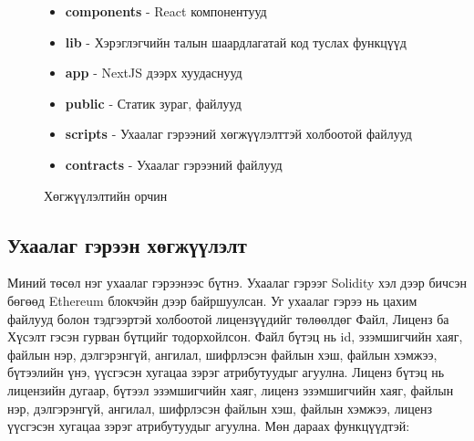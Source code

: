 \begin{figure}[htbp]
\begin{minipage}[ht]{0.4\textwidth}
       \caption{Хөгжүүлэлтийн орчин}
   \end{minipage}
   \begin{minipage}[h!t]{0.5\textwidth}
      \raggedright
      \begin{itemize}
         \item \textbf{components} - React компонентууд
         \item \textbf{lib} - Хэрэглэгчийн талын шаардлагатай код туслах функцүүд
         \item \textbf{app} - NextJS дээрх хуудаснууд
         \item \textbf{public} - Статик зураг, файлууд
         \item \textbf{scripts} - Ухаалаг гэрээний хөгжүүлэлттэй холбоотой файлууд
         \item \textbf{contracts} - Ухаалаг гэрээний файлууд
      \end{itemize}
  \end{minipage}
\end{figure}

\newpage
\subsection{Ухаалаг гэрээн хөгжүүлэлт}
Миний төсөл нэг ухаалаг гэрээнээс бүтнэ. Ухаалаг гэрээг Solidity хэл дээр бичсэн бөгөөд Ethereum  блокчэйн дээр байршуулсан. Уг ухаалаг гэрээ нь цахим файлууд болон тэдгээртэй холбоотой лицензүүдийг төлөөлдөг Файл, Лиценз ба Хүсэлт гэсэн гурван бүтцийг тодорхойлсон. Файл бүтэц  нь id, эзэмшигчийн хаяг, файлын нэр, дэлгэрэнгүй, ангилал, шифрлэсэн файлын хэш, файлын хэмжээ, бүтээлийн үнэ, үүсгэсэн хугацаа зэрэг атрибутуудыг агуулна. Лиценз бүтэц нь лицензийн дугаар, бүтээл эзэмшигчийн хаяг, лиценз эзэмшигчийн хаяг, файлын нэр, дэлгэрэнгүй, ангилал, шифрлэсэн файлын хэш, файлын хэмжээ, лиценз үүсгэсэн хугацаа  зэрэг атрибутуудыг агуулна.
Мөн дараах функцүүдтэй:

